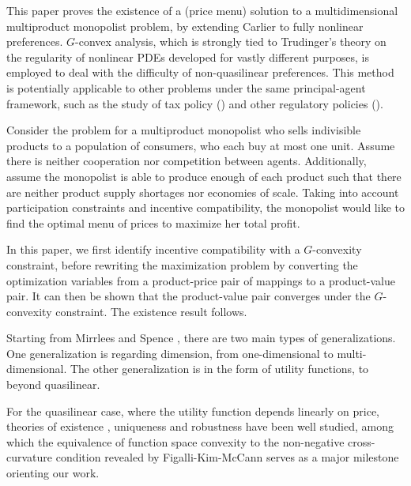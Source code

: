 \documentclass[a4paper, 11pt]{amsart}
\numberwithin{equation}{section}
\theoremstyle{plain}
\theoremstyle{definition}
\theoremstyle{remark}
\begin{document}
	This paper proves the existence of a (price menu) solution to a multidimensional multiproduct monopolist problem, {by extending} %
	Carlier \cite{Carlier01} to fully nonlinear preferences. $G$-convex analysis,  which is strongly tied to Trudinger's theory on the regularity of nonlinear PDEs \cite{Trudinger14}  developed for vastly different purposes, is employed to deal with the difficulty of non-quasilinear preferences. This method is potentially applicable to other problems under the same principal-agent framework, such as the study of tax policy (\cite{Mirrlees71}) and other regulatory policies (\cite{BaronMyerson82}). \medskip

	


Consider the problem for a multiproduct monopolist who sells indivisible products to a population of consumers, who each buy at most one unit. Assume there is neither cooperation nor competition between agents. Additionally, assume the monopolist is able to produce enough of each product such that there are neither product supply shortages {nor economies of scale}. Taking into account participation constraints and incentive compatibility, the monopolist would like to find the optimal menu of prices to maximize her total profit.\medskip

	In this paper, we first identify incentive compatibility with a $G$-convexity constraint, before rewriting the maximization problem by converting the optimization variables from a product-price pair of mappings to a product-value pair. It can then be shown that the product-value pair converges under the $G$-convexity constraint. The existence result follows. \medskip






	
Starting from Mirrlees \cite{Mirrlees71} and Spence \cite{Spence74}, there are two main types of generalizations. One generalization is regarding dimension, from one-dimensional to multi-dimensional. The other generalization is in the form of utility functions, to beyond quasilinear.\medskip



For the quasilinear case, where the utility function depends linearly on price, theories of existence \cite{Basov05,RochetStole03,Carlier01,MonteiroPage98}, uniqueness \cite{CarlierLachand-Robert01,FigalliKimMcCann11,MussaRosen78,RochetChone98} and robustness \cite{Basov05,FigalliKimMcCann11} have been well studied, among which the equivalence of function space convexity to the non-negative cross-curvature condition revealed by Figalli-Kim-McCann \cite{FigalliKimMcCann11} serves as a major milestone {orienting our work}. \medskip
\end{document}

